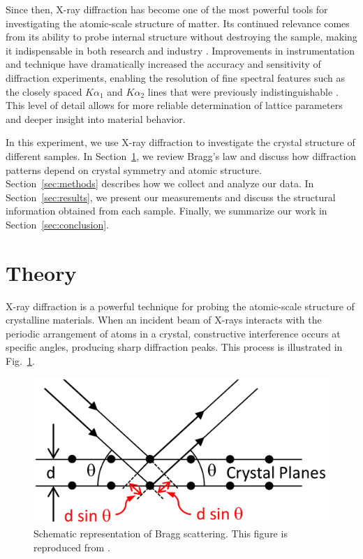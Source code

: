 \documentclass{../paper}
\newcommand{\fig}[1]{Fig.~#1}
\begin{document}
Since then, X-ray diffraction has become one of the most powerful tools for investigating the atomic-scale structure of matter. Its continued relevance comes from its ability to probe internal structure without destroying the sample, making it indispensable in both research and industry \cite{Cullity}. Improvements in instrumentation and technique have dramatically increased the accuracy and sensitivity of diffraction experiments, enabling the resolution of fine spectral features such as the closely spaced $K\alpha_1$ and $K\alpha_2$ lines that were previously indistinguishable \cite{Cullity}. This level of detail allows for more reliable determination of lattice parameters and deeper insight into material behavior.

In this experiment, we use X-ray diffraction to investigate the crystal structure of different samples. In Section~\ref{sec:theory}, we review Bragg's law and discuss how diffraction patterns depend on crystal symmetry and atomic structure. Section~\ref{sec:methods} describes how we collect and analyze our data. In Section~\ref{sec:results}, we present our measurements and discuss the structural information obtained from each sample. Finally, we summarize our work in Section~\ref{sec:conclusion}.

\section{Theory}\label{sec:theory}

X-ray diffraction is a powerful technique for probing the atomic-scale structure of crystalline materials. When an incident beam of X-rays interacts with the periodic arrangement of atoms in a crystal, constructive interference occurs at specific angles, producing sharp diffraction peaks. This process is illustrated in \fig{\ref{fig:angles}}.

\begin{figure}
  \centering
  \includegraphics[width=0.6\columnwidth]{assets/bragg-scattering.png}
  \caption{Schematic representation of Bragg scattering. This figure is reproduced from \cite{LabManual}.}
  \label{fig:angles}
\end{figure}
\end{document}
